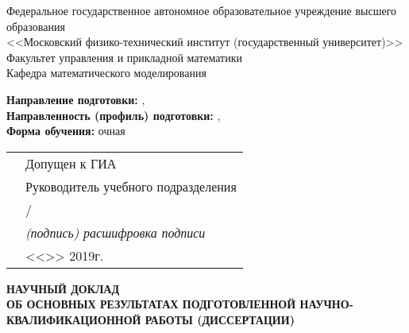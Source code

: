 \thispagestyle{empty}
\begin{center}
Федеральное государственное автономное образовательное учреждение высшего
образования \\
<<Московский физико-технический институт (государственный университет)>> \\
Факультет управления и прикладной математики \\
Кафедра математического моделирования \\
\end{center}

\vspace{0pt plus1fill}
\small
\begin{flushleft}
\textbf {Направление подготовки:} \thesisSpecialtyNumber, \thesisSpecialtyTitle \\
\textbf {Направленность (профиль) подготовки:} \thesisSpecialtyTwoNumber, \thesisSpecialtyTwoTitle \\
\textbf {Форма обучения:} очная
\end{flushleft}

\begin{flushright}
  \begin{tabularx}{\textwidth}{XX}
    &Допущен к ГИА \\
    &Руководитель учебного подразделения \\
    &\underline{\hspace{3cm}}/\underline{\hspace{4cm}} \\
    &\hspace{1cm}\textit {(подпись) расшифровка подписи} \\
    & <<\underline {\hspace{1cm}}>> \underline {\hspace{3cm}} 2019г.
  \end{tabularx}
\end{flushright}

\vspace{0pt plus3fill}
\begin{center}
\textbf {НАУЧНЫЙ ДОКЛАД} \\
\textbf {ОБ ОСНОВНЫХ РЕЗУЛЬТАТАХ ПОДГОТОВЛЕННОЙ НАУЧНО-КВАЛИФИКАЦИОННОЙ РАБОТЫ (ДИССЕРТАЦИИ)}

\vspace{0pt plus2fill}

\textbf {\thesisTitle}
\end{center}

